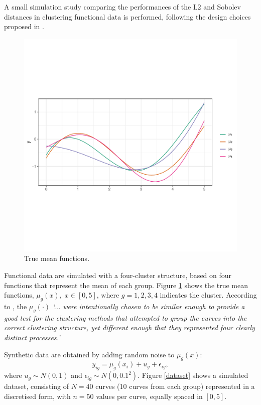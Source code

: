 \documentclass[smallextended,natbib]{svjour3}\usepackage[]{graphicx}\usepackage[]{xcolor}
\newcommand{\1}[1]{\mathbbm{1}_{#1}}
\begin{document}
A small simulation study comparing the performances of the L2 and Sobolev distances in clustering functional data is performed, following the design choices proposed in \cite{hitchcock2007effect}. 
\begin{figure}[hbpt]
\centering
\includegraphics[trim=0cm 4cm 0cm 3cm, clip, scale=.6]{figures/fig-simstudy1.pdf}
\caption{True mean functions. \label{meanfun} }
\end{figure}

Functional data are simulated with a four-cluster structure, based on four functions that represent the mean of each group. Figure \ref{meanfun} shows the true mean functions, $\mu_g(x), \; x \in \left[0, 5\right]$, where $g=1,2,3,4$ indicates the cluster. According to \cite{hitchcock2007effect}, the $\mu_g(\cdot)$ \textit{`... were intentionally chosen to be similar enough to provide a good test for the clustering methods that attempted to group the curves into the correct clustering structure, yet different enough that they represented four clearly distinct
processes.'}

Synthetic data are obtained by adding random noise to $\mu_g(x)$:  
\[ y_{ig} = \mu_g(x_i) + u_g + \epsilon_{ig}, \]
where $u_g \sim N(0, 1)$ and $\epsilon_{ig} \sim N(0, 0.1^2)$. Figure \ref{dataset} shows a simulated dataset, consisting of $N=40$ curves (10 curves from each group) represented in a discretised form, with $n=50$ values per curve, equally spaced in $\left[0, 5\right]$.  
\end{document}
